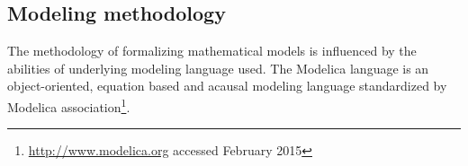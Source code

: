 \subsection{Modeling methodology}
\label{sec:methodsmodels}

The methodology of formalizing mathematical models is influenced by the abilities of underlying modeling language used. 
The Modelica language is an object-oriented, equation based and acausal modeling language standardized by Modelica association\footnote{\url{http://www.modelica.org} accessed February 2015}.

